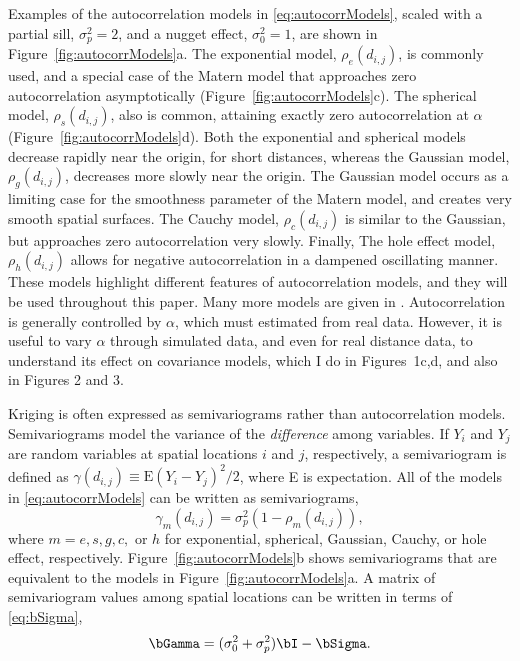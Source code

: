 Examples of the autocorrelation models in \ref{eq:autocorrModels}, scaled with a partial sill, $\sigma^2_p = 2$, and a nugget effect, $\sigma^2_0 = 1$, are shown in Figure~\ref{fig:autocorrModels}a.  The exponential model, $\rho_e(d_{i,j})$, is commonly used, and a special case of the Matern model that approaches zero autocorrelation asymptotically (Figure~\ref{fig:autocorrModels}c). The spherical model, $\rho_s(d_{i,j})$, also is common, attaining exactly zero autocorrelation at $\alpha$ (Figure~\ref{fig:autocorrModels}d).  Both the exponential and spherical models decrease rapidly near the origin, for short distances, whereas the Gaussian model, $\rho_g(d_{i,j})$, decreases more slowly near the origin. The Gaussian model occurs as a limiting case for the smoothness parameter of the Matern model, and creates very smooth spatial surfaces. The Cauchy model, $\rho_c(d_{i,j})$ is similar to the Gaussian, but approaches zero autocorrelation very slowly. Finally, The hole effect model, $\rho_h(d_{i,j})$ allows for negative autocorrelation in a dampened oscillating manner. These models highlight different features of autocorrelation models, and they will be used throughout this paper. Many more models are given in \citet[][p. 80--93]{Chil:Delf:geos:1999}.  Autocorrelation is generally controlled by $\alpha$, which must estimated from real data.  However, it is useful to vary $\alpha$ through simulated data, and even for real distance data, to understand its effect on covariance models, which I do in Figures~1c,d, and also in Figures 2 and 3.

Kriging is often expressed as semivariograms rather than autocorrelation models.  Semivariograms model the variance of the \emph{difference} among variables. If $Y_i$ and $Y_j$ are random variables at spatial locations $i$ and $j$, respectively, a semivariogram is defined as $\gamma(d_{i,j}) \equiv \textrm{E}(Y_i - Y_j)^2/2$, where E is expectation.  All of the models in \ref{eq:autocorrModels} can be written as semivariograms,
\begin{equation} \label{eq:semivarrho}
				\gamma_m(d_{i,j}) = \sigma^2_p(1 - \rho_m(d_{i,j})),
\end{equation}
where $m = e, s, g, c,$ or $h$ for exponential, spherical, Gaussian, Cauchy, or hole effect, respectively. Figure~\ref{fig:autocorrModels}b shows semivariograms that are equivalent to the models in Figure~\ref{fig:autocorrModels}a.  A matrix of semivariogram values among spatial locations can be written in terms of \ref{eq:bSigma},
\[
\bGamma = (\sigma_0^2 + \sigma^2_p)\bI - \bSigma.
\]


